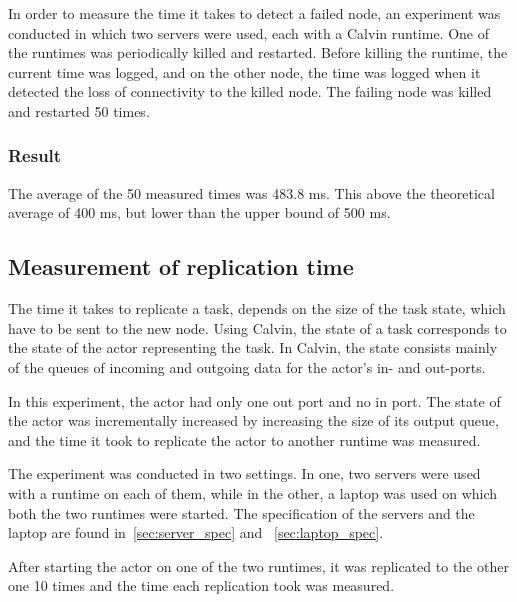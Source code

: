 \documentclass{cslthse-msc}
\begin{document}
In order to measure the time it takes to detect a failed node, an experiment was conducted in which two servers were used, each with a Calvin runtime. One of the runtimes was periodically killed and restarted. Before killing the runtime, the current time was logged, and on the other node, the time was logged when it detected the loss of connectivity to the killed node. The failing node was killed and restarted 50 times.

\subsubsection*{Result}
The average of the 50 measured times was 483.8 ms. This above the theoretical average of 400 ms, but lower than the upper bound of 500 ms.


\subsection{Measurement of replication time} \label{sec:eval_repl_time}
The time it takes to replicate a task, depends on the size of the task state, which have to be sent to the new node. Using Calvin, the state of a task corresponds to the state of the actor representing the task. In Calvin, the state consists mainly of the queues of incoming and outgoing data for the actor's in- and out-ports.

In this experiment, the actor had only one out port and no in port. The state of the actor was incrementally increased by increasing the size of its output queue, and the time it took to replicate the actor to another runtime was measured.

The experiment was conducted in two settings. In one, two servers were used with a runtime on each of them, while in the other, a laptop was used on which both the two runtimes were started. The specification of the servers and the laptop are found in~\cref{sec:server_spec} and ~\cref{sec:laptop_spec}.

After starting the actor on one of the two runtimes, it was replicated to the other one 10 times and the time each replication took was measured. 
\end{document}
